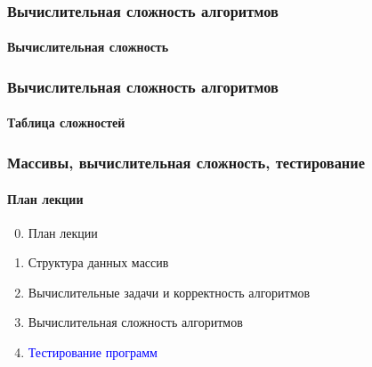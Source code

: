 \documentclass[aspectratio=169]{beamer}
\begin{document}
\begin{frame}
\frametitle{Вычислительная сложность алгоритмов}
\framesubtitle{Вычислительная сложность}
\justifying

\begin{figure}
    \captionsetup[subfigure]{labelformat=empty}
    \centering
\end{figure}
\end{frame}

\begin{frame}
\frametitle{Вычислительная сложность алгоритмов}
\framesubtitle{Таблица сложностей}
\justifying

\begin{figure}
    \captionsetup[subfigure]{labelformat=empty}
    \centering
\end{figure}
\end{frame}

\begin{frame}
\frametitle{Массивы, вычислительная сложность, тестирование}
\framesubtitle{План лекции}

\begin{enumerate}
  \setcounter{enumi}{-1}
  \item{План лекции}
  \item{Структура данных массив}
  \item{Вычислительные задачи и корректность алгоритмов}
  \item{Вычислительная сложность алгоритмов}
  \item{\textcolor{blue}{Тестирование программ}}
\end{enumerate}
\end{frame}
\end{document}
